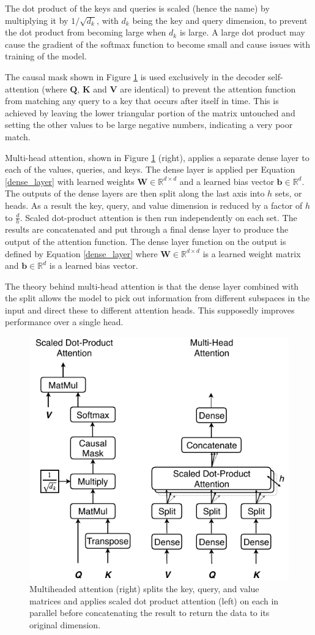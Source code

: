 \documentclass[conference]{IEEEtran}
\begin{document}
The dot product of the keys and queries is scaled (hence the name) by multiplying it by $1 / \sqrt{d_k}$, with $d_k$ being the key and query dimension, to prevent the dot product from becoming large when $d_k$ is large.
A large dot product may cause the gradient of the softmax function to become small and cause issues with training of the model.

The causal mask shown in Figure \ref{fig:multihead} is used exclusively in the decoder self-attention (where $\boldsymbol{Q}$, $\boldsymbol{K}$ and $\boldsymbol{V}$ are identical) to prevent the attention function from matching any query to a key that occurs after itself in time.
This is achieved by leaving the lower triangular portion of the matrix untouched and setting the other values to be large negative numbers, indicating a very poor match.

Multi-head attention, shown in Figure \ref{fig:multihead} (right), applies a separate dense layer to each of the values, queries, and keys. 
The dense layer is applied per Equation \ref{dense_layer} with learned weights $\boldsymbol{W} \in \mathbb{R}^{d \times d}$ and a learned bias vector $\boldsymbol{b} \in \mathbb{R}^{d}$.
The outputs of the dense layers are then split along the last axis into $h$ sets, or heads.
As a result the key, query, and value dimension is reduced by a factor of $h$ to $\frac{d}{h}$.
Scaled dot-product attention is then run independently on each set.
The results are concatenated and put through a final dense layer to produce the output of the attention function.
The dense layer function on the output is defined by Equation \ref{dense_layer} where $\boldsymbol{W} \in \mathbb{R}^{d \times d}$ is a learned weight matrix and $\boldsymbol{b} \in \mathbb{R}^{d}$ is a learned bias vector.

The theory behind multi-head attention is that the dense layer combined with the split allows the model to pick out information from different subspaces in the input and direct these to different attention heads.
This supposedly improves performance over a single head.

\begin{figure}[htbp]
	\centerline{\includegraphics[width=.35\textwidth]{images/multihead_attn.pdf}}
	\caption{Multiheaded attention (right) splits the key, query, and value matrices and applies scaled dot product attention (left) on each in parallel before concatenating the result to return the data to its original dimension.}
	\label{fig:multihead}
\end{figure}
\end{document}
